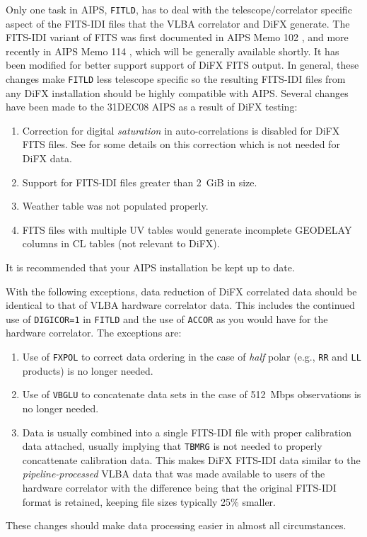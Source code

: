 Only one task in AIPS, {\tt FITLD}, has to deal with the telescope/correlator specific aspect of the FITS-IDI files that the VLBA correlator and DiFX generate.
The FITS-IDI variant of FITS was first documented in AIPS Memo 102 \cite{aips102}, and more recently in AIPS Memo 114 \cite{aips114}, which will be generally available shortly.
It has been modified for better support support of DiFX FITS output.
In general, these changes make {\tt FITLD} less telescope specific so the resulting FITS-IDI files from any DiFX installation should be highly compatible with AIPS.
Several changes have been made to the 31DEC08 AIPS as a result of DiFX testing:
\begin{enumerate}
\item Correction for digital {\it saturation} in auto-correlations is disabled for DiFX FITS files.  See \cite{sci12} for some details on this correction which is not needed for DiFX data.
\item Support for FITS-IDI files greater than 2~GiB in size.
\item Weather table was not populated properly.
\item FITS files with multiple UV tables would generate incomplete GEODELAY columns in CL tables (not relevant to DiFX).
\end{enumerate}
It is recommended that your AIPS installation be kept up to date.

With the following exceptions, data reduction of DiFX correlated data should be identical to that of VLBA hardware correlator data.
This includes the continued use of {\tt DIGICOR=1} in {\tt FITLD} and the use of {\tt ACCOR} as you would have for the hardware correlator.
The exceptions are:
\begin{enumerate}
\item Use of {\tt FXPOL} to correct data ordering in the case of {\em half} polar (e.g., {\tt RR} and {\tt LL} products) is no longer needed.
\item Use of {\tt VBGLU} to concatenate data sets in the case of 512~Mbps observations is no longer needed.
\item Data is usually combined into a single FITS-IDI file with proper calibration data attached, usually implying that {\tt TBMRG} is not needed to properly concattenate calibration data.  This makes DiFX FITS-IDI data similar to the {\em pipeline-processed} VLBA data that was made available to users of the hardware correlator with the difference being that the original FITS-IDI format is retained, keeping file sizes typically 25\% smaller. 
\end{enumerate}
These changes should make data processing easier in almost all circumstances.
